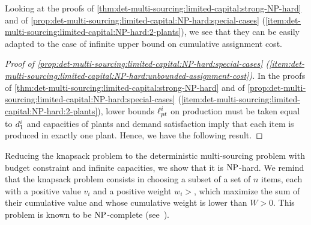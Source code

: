 Looking at the proofs of \cref{thm:det-multi-sourcing:limited-capital:strong-NP-hard} and of \cref{prop:det-multi-sourcing:limited-capital:NP-hard:special-cases} (\cref{item:det-multi-sourcing:limited-capital:NP-hard:2-plants}), we see that they can be easily adapted to the case of infinite upper bound on cumulative assignment cost.



\begin{proof}[Proof of \cref{prop:det-multi-sourcing:limited-capital:NP-hard:special-cases} (\cref{item:det-multi-sourcing:limited-capital:NP-hard:unbounded-assignment-cost})]
In the proofs of \cref{thm:det-multi-sourcing:limited-capital:strong-NP-hard} and of \cref{prop:det-multi-sourcing:limited-capital:NP-hard:special-cases} (\cref{item:det-multi-sourcing:limited-capital:NP-hard:2-plants}), lower bounds $\ell_{pt}^i$ on production must be taken equal to $d_1^i$ and capacities of plants and demand satisfaction imply that each item is produced in exactly one plant.
Hence, we have the following result.
\end{proof}







Reducing the knapsack problem to the deterministic multi-sourcing problem with budget constraint and infinite capacities, we show that it is $\operatorname{NP}$-hard.
We remind that the knapsack problem consists in choosing a subset of a set of $n$ items, each with a positive value $v_i$ and a positive weight $w_i>$, which maximize the sum of their cumulative value and whose cumulative weight is lower than $W>0$.
This problem is known to be $\operatorname{NP}$-complete (see~\citet{Garey1979}).


